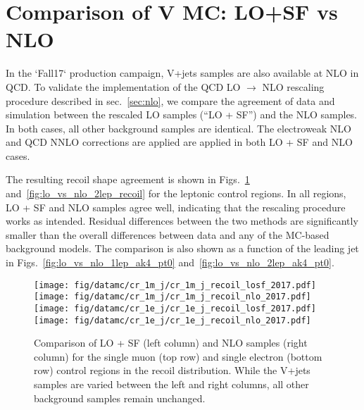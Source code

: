 \section{Comparison of V MC: LO+SF vs NLO }
\label{sec:lo_vs_nlo}
In the `Fall17` production campaign, V+jets samples are also available at NLO in QCD. To validate the implementation of the QCD LO $\rightarrow$ NLO rescaling procedure described in sec.~\ref{sec:nlo}, we compare the agreement of data and simulation between the rescaled LO samples (``LO + SF'') and the NLO samples. In both cases, all other background samples are identical. The electroweak NLO and QCD NNLO corrections are applied are applied in both LO + SF and NLO cases.

The resulting recoil shape agreement is shown in Figs.~\ref{fig:lo_vs_nlo_1lep_recoil} and~\ref{fig:lo_vs_nlo_2lep_recoil} for the leptonic control regions. In all regions, LO + SF and NLO samples agree well, indicating that the rescaling procedure works as intended. Residual differences between the two methods are significantly smaller than the overall differences between data and any of the MC-based background models. The comparison is also shown as a function of the leading jet \pt in Figs.~\ref{fig:lo_vs_nlo_1lep_ak4_pt0} and~\ref{fig:lo_vs_nlo_2lep_ak4_pt0}.



\begin{figure}[htbp]
    \begin{center}
        \texttt{[image: fig/datamc/cr\_1m\_j/cr\_1m\_j\_recoil\_losf\_2017.pdf]}
        \texttt{[image: fig/datamc/cr\_1m\_j/cr\_1m\_j\_recoil\_nlo\_2017.pdf]} \\
        \texttt{[image: fig/datamc/cr\_1e\_j/cr\_1e\_j\_recoil\_losf\_2017.pdf]}
        \texttt{[image: fig/datamc/cr\_1e\_j/cr\_1e\_j\_recoil\_nlo\_2017.pdf]} \\
    \end{center}
    \caption{Comparison of LO + SF (left column) and NLO samples (right column) for the single muon (top row) and single electron (bottom row) control regions in the recoil distribution. While the V+jets samples are varied between the left and right columns, all other background samples remain unchanged.}
    \label{fig:lo_vs_nlo_1lep_recoil}
\end{figure}



